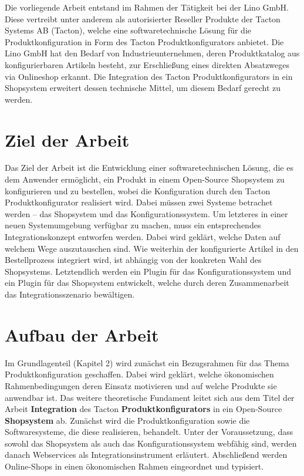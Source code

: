 \documentclass[11pt, a4paper, titlepage, listof=totoc, bibliography=totoc, index=totoc, twoside, openright, headings=normal]{scrreprt}
\begin{document}
Die vorliegende Arbeit entstand im Rahmen der Tätigkeit bei der Lino GmbH. Diese vertreibt unter anderem als autorisierter Reseller Produkte der Tacton Systems AB (Tacton), welche eine softwaretechnische Lösung für die Produktkonfiguration in Form des Tacton Produktkonfigurators anbietet. Die Lino GmbH hat den Bedarf von Industrieunternehmen, deren Produktkatalog aus konfigurierbaren Artikeln besteht, zur Erschließung eines direkten Absatzweges via Onlineshop erkannt. Die Integration des Tacton Produktkonfigurators in ein Shopsystem erweitert dessen technische Mittel, um diesem Bedarf gerecht zu werden.

\section{Ziel der Arbeit}
Das Ziel der Arbeit ist die Entwicklung einer softwaretechnischen Lösung, die es dem Anwender ermöglicht, ein Produkt in einem Open-Source Shopsystem zu konfigurieren und zu bestellen, wobei die Konfiguration durch den Tacton Produktkonfigurator realisiert wird. Dabei müssen zwei Systeme betrachet werden -- das Shopsystem und das Konfigurationssystem. Um letzteres in einer neuen Systemumgebung verfügbar zu machen, muss ein entsprechendes Integrationskonzept entworfen werden. Dabei wird geklärt, welche Daten auf welchem Wege auszutauschen sind. Wie weiterhin der konfigurierte Artikel in den Bestellprozess integriert wird, ist abhängig von der konkreten Wahl des Shopsystems. Letztendlich werden ein Plugin für das Konfigurationssystem und ein Plugin für das Shopsystem entwickelt, welche durch deren Zusammenarbeit das Integrationsszenario bewältigen.

\section{Aufbau der Arbeit}
Im Grundlagenteil (Kapitel 2) wird zunächst ein Bezugsrahmen für das Thema Produktkonfiguration geschaffen. Dabei wird geklärt, welche ökonomischen Rahmenbedingungen deren Einsatz motivieren und auf welche Produkte sie anwendbar ist. Das weitere theoretische Fundament leitet sich aus dem Titel der Arbeit \glqq \textbf{Integration} des Tacton \textbf{Produktkonfigurators} in ein Open-Source \textbf{Shopsystem}\grqq{} ab. Zunächst wird die Produktkonfiguration sowie die Softwaresysteme, die diese realisieren, behandelt. Unter der Voraussetzung, dass sowohl das Shopsystem als auch das Konfigurationssystem webfähig sind, werden danach Webservices als Integrationsinstrument erläutert. Abschließend werden Online-Shops in einen ökonomischen Rahmen eingeordnet und typisiert. 
\end{document}
